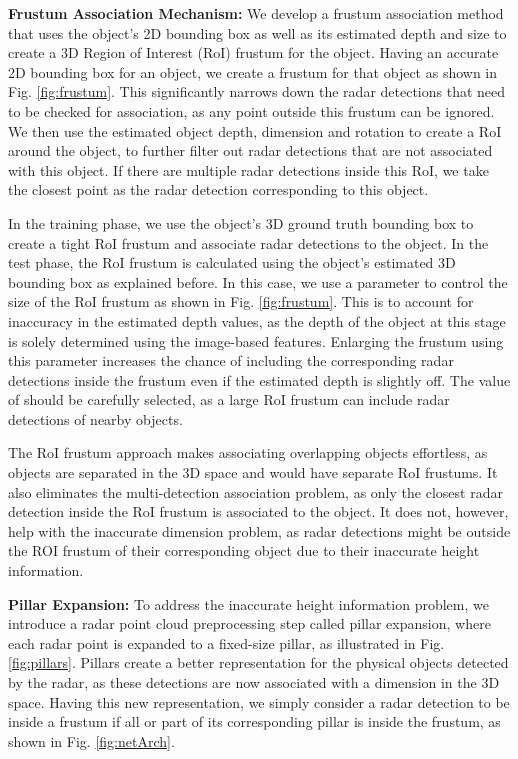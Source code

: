 \documentclass[10pt,twocolumn,letterpaper]{article}
\begin{document}
   \textbf{Frustum Association Mechanism:}
   We develop a frustum association method that uses the object's 2D bounding 
   box as well as its estimated depth and size to create a 3D Region of Interest (RoI)
   frustum for the object. Having an accurate 2D bounding box for an object, we create 
   a frustum for that object as shown in Fig. \ref{fig:frustum}. This significantly
   narrows down the radar detections that need to be checked for association, as any
   point outside this frustum can be ignored. We then use the estimated object depth,
   dimension and rotation to create a RoI around the object, to further filter out 
   radar detections that are not associated with this object. If there are multiple 
   radar detections inside this RoI, we take the closest point as the radar detection 
   corresponding to this object. 
   
   In the training phase, we use the object's 3D ground truth bounding box
   to create a tight RoI frustum and associate radar detections to the object. 
   In the test phase, the RoI frustum is calculated 
   using the object's estimated 3D bounding box as explained before. In this case, 
   we use a parameter  to control the size of the RoI frustum
   as shown in Fig. \ref{fig:frustum}.
   This is to account for inaccuracy in the estimated depth values, as the depth 
   of the object at this stage is solely determined using the image-based features. 
   Enlarging the frustum using this parameter increases the chance
   of including the corresponding radar detections inside the frustum even if 
   the estimated depth is slightly off. The value of  should be carefully 
   selected, as a large RoI frustum can include radar detections of nearby objects.
   
   The RoI frustum approach makes associating
   overlapping objects effortless, as objects are separated in the 3D space 
   and would have separate RoI frustums. It also eliminates the multi-detection 
   association problem, as only the closest radar detection inside the RoI frustum
   is associated to the object. It does not, however, help with the inaccurate 
    dimension problem, as radar detections might be outside the 
   ROI frustum of their corresponding object due to their inaccurate height 
   information. 
   
   \textbf{Pillar Expansion:}
   To address the inaccurate height information problem, we introduce a radar 
   point cloud preprocessing 
   step called pillar expansion, where each radar point is expanded to 
   a fixed-size pillar, as illustrated in Fig. \ref{fig:pillars}.
   Pillars create a better representation for the physical objects detected
   by the radar, as these detections are now associated with a dimension in 
   the 3D space. Having this new representation, we simply consider a radar detection to be inside a frustum 
   if all or part of its corresponding pillar is inside the frustum, as shown 
   in Fig. \ref{fig:netArch}.
   
\end{document}
